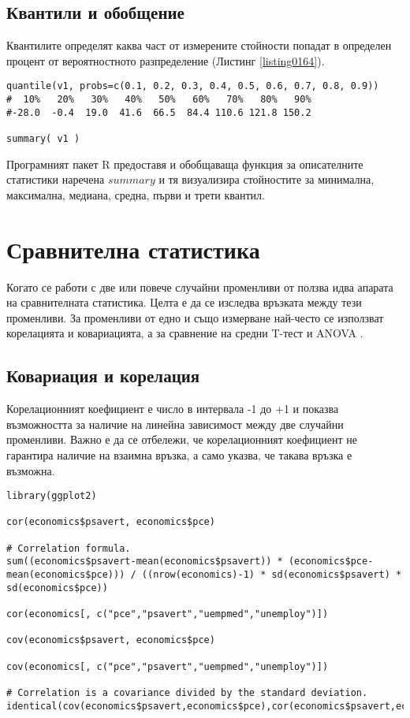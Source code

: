 \subsection{Квантили и обобщение}

Квантилите определят каква част от измерените стойности попадат в определен процент от вероятностното разпределение (Листинг \ref{listing0164}).

\begin{lstlisting}[caption=Квантили и обобщение, label=listing0165]
quantile(v1, probs=c(0.1, 0.2, 0.3, 0.4, 0.5, 0.6, 0.7, 0.8, 0.9))
#  10%   20%   30%   40%   50%   60%   70%   80%   90% 
#-28.0  -0.4  19.0  41.6  66.5  84.4 110.6 121.8 150.2 

summary( v1 )
\end{lstlisting}

Програмният пакет R предоставя и обобщаваща функция за описателните статистики наречена $summary$ и тя визуализира стойностите за минимална, максимална, медиана, средна, първи и трети квантил.

\section{Сравнителна статистика}

Когато се работи с две или повече случайни променливи от ползва идва апарата на сравнителната статистика. Целта е да се изследва връзката между тези променливи. За променливи от едно и също измерване най-често се използват корелацията и ковариацията, а за сравнение на средни T-тест и ANOVA \cite{anova}. 

\subsection{Ковариация и корелация}

Корелационният коефициент е число в интервала -1 до +1 и показва възможността за наличие на линейна зависимост между две случайни променливи. Важно е да се отбележи, че корелационният коефициент не гарантира наличие на взаимна връзка, а само указва, че такава връзка е възможна. 

\begin{lstlisting}[caption=Ковариация и корелация, label=listing0166]
library(ggplot2)

cor(economics$psavert, economics$pce)

# Correlation formula.
sum((economics$psavert-mean(economics$psavert)) * (economics$pce-mean(economics$pce))) / ((nrow(economics)-1) * sd(economics$psavert) * sd(economics$pce))

cor(economics[, c("pce","psavert","uempmed","unemploy")])

cov(economics$psavert, economics$pce)

cov(economics[, c("pce","psavert","uempmed","unemploy")])

# Correlation is a covariance divided by the standard deviation.
identical(cov(economics$psavert,economics$pce),cor(economics$psavert,economics$pce)*sd(economics$psavert)*sd(economics$pce))
\end{lstlisting}

